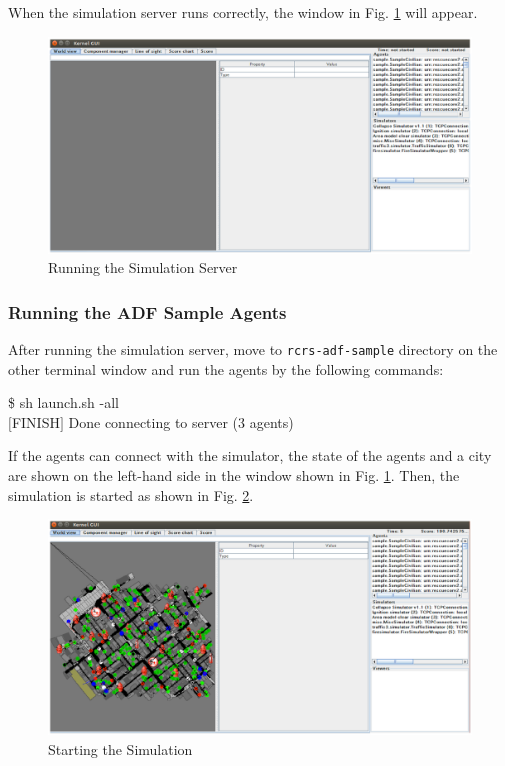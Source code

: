 \documentclass{article}
\begin{document}
When the simulation server runs correctly, the window in Fig. \ref{fig:simulator01} will appear.
\begin{figure}[ht]
 \begin{center}
  \includegraphics[width=.9\linewidth]{figs/simulator01.eps}
  \caption{Running the Simulation Server}
  \label{fig:simulator01}
 \end{center}
\end{figure}
\subsubsection{Running the ADF Sample Agents}
After running the simulation server, move to \texttt{rcrs-adf-sample} directory on the other terminal window and run the agents by the following commands:
\begin{center}
   \begin{tcolorbox}[title=Running Sample Agents, width=.98\linewidth]
    {\ttfamily
    \$ sh launch.sh -all\\
    $[$FINISH$]$ Done connecting to server (3 agents)
    }
  \end{tcolorbox}
\end{center}

If the agents can connect with the simulator, the state of the agents and a city are shown on the left-hand side in the window shown in Fig. \ref{fig:simulator01}. Then, the simulation is started as shown in Fig. \ref{fig:simulator02}.
\begin{figure}[ht]
 \begin{center}
  \includegraphics[width=1.0\linewidth]{figs/simulator02.eps}
  \caption{Starting the Simulation}
  \label{fig:simulator02}
 \end{center}
\end{figure}
\end{document}
